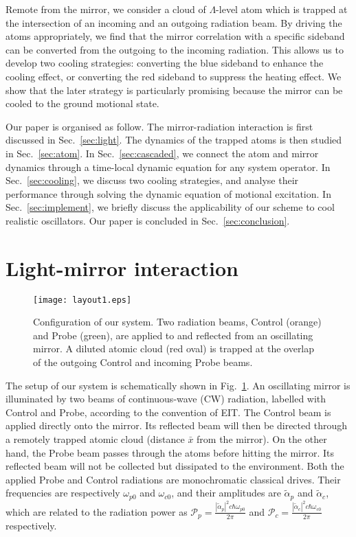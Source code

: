 \documentclass[aps, pra, reprint, amsmath, amssymb, groupedaddress, acknowledgments]{revtex4-1}
\begin{document}
Remote from the mirror, we consider a cloud of $\Lambda$-level atom which is trapped at the intersection of an incoming and an outgoing radiation beam. 
By driving the atoms appropriately, we find that the mirror correlation with a specific sideband can be converted from the outgoing to the incoming radiation.  This allows us to develop two cooling strategies: converting the blue sideband to enhance the cooling effect, or converting the red sideband to suppress the heating effect.  We show that the later strategy is particularly promising because the mirror can be cooled to the ground motional state.

Our paper is organised as follow.  The mirror-radiation interaction is first discussed in Sec.~\ref{sec:light}.  The dynamics of the trapped atoms is then studied in Sec.~\ref{sec:atom}.  In Sec.~\ref{sec:cascaded}, we connect the atom and mirror dynamics through a time-local dynamic equation for any system operator.   
In Sec.~\ref{sec:cooling}, we discuss two cooling strategies, and analyse their performance through solving the dynamic equation of motional excitation.  In Sec.~\ref{sec:implement}, we briefly discuss the applicability of our scheme to cool realistic oscillators.  Our paper is concluded in Sec.~\ref{sec:conclusion}.  


\section{Light-mirror interaction \label{sec:light}}

\begin{figure}
\begin{center}
\texttt{[image: layout1.eps]}
\caption{ \label{fig:setup} Configuration of our system.  Two radiation beams, Control (orange) and Probe (green), are applied to and reflected from an oscillating mirror.  A diluted atomic cloud (red oval) is trapped at the overlap of the outgoing Control and incoming Probe beams.  }
\end{center}
\end{figure}

The setup of our system is schematically shown in Fig.~\ref{fig:setup}.  An oscillating mirror is illuminated by two beams of continuous-wave (CW) radiation, labelled with Control and Probe, according to the convention of EIT.  The Control beam is applied directly onto the mirror.  Its reflected beam will then be directed through a remotely trapped atomic cloud (distance $\bar{x}$ from the mirror).  On the other hand, the Probe beam passes through the atoms before hitting the mirror.  Its reflected beam will not be collected but dissipated to the environment.  Both the applied Probe and Control radiations are monochromatic classical drives.  Their frequencies are respectively $\omega_{p0}$ and $\omega_{c0}$, and their amplitudes are $\tilde{\alpha}_p$ and $\tilde{\alpha}_c$, which are related to the radiation power as $\mathcal{P}_{p}=\frac{|\tilde{\alpha}_p|^2 c \hbar \omega_{p0} }{2 \pi}$ and $\mathcal{P}_{c}=\frac{|\tilde{\alpha}_c|^2 c \hbar \omega_{c0} }{2 \pi}$ respectively.  
\end{document}
